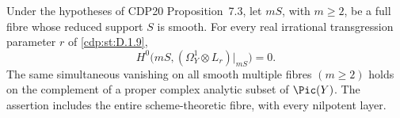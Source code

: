 \begin{proposition}\label{cdp:st:A.3.4}
Under the hypotheses of CDP20 Proposition~7.3, let $mS$, with $m\ge2$, be a full fibre whose reduced support $S$ is smooth. For every real irrational transgression parameter $r$ of \ref{cdp:st:D.1.9},
\[
 H^0\bigl(mS,(\Omega_Y^1\otimes L_r)|_{mS}\bigr)=0.
 \tag{A.15a}\label{cdp:eq:A.15a}
\]
The same simultaneous vanishing on all smooth multiple fibres $(m\ge2)$ holds on the complement of a proper complex analytic subset of $\Pic(Y)$. The assertion includes the entire scheme-theoretic fibre, with every nilpotent layer.
\end{proposition}

